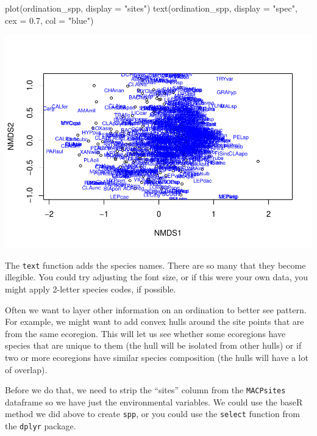 \documentclass[
]{book}
\newenvironment{Shaded}{\begin{snugshade}}{\end{snugshade}}
\newcommand{\AttributeTok}[1]{\textcolor[rgb]{0.77,0.63,0.00}{#1}}
\newcommand{\FloatTok}[1]{\textcolor[rgb]{0.00,0.00,0.81}{#1}}
\newcommand{\FunctionTok}[1]{\textcolor[rgb]{0.00,0.00,0.00}{#1}}
\newcommand{\NormalTok}[1]{#1}
\newcommand{\StringTok}[1]{\textcolor[rgb]{0.31,0.60,0.02}{#1}}
\begin{document}
\begin{Shaded}
\begin{Highlighting}[]
\FunctionTok{plot}\NormalTok{(ordination\_spp, }\AttributeTok{display =} \StringTok{"sites"}\NormalTok{)}
\FunctionTok{text}\NormalTok{(ordination\_spp, }\AttributeTok{display =} \StringTok{"spec"}\NormalTok{, }\AttributeTok{cex =} \FloatTok{0.7}\NormalTok{, }\AttributeTok{col =} \StringTok{"blue"}\NormalTok{)}
\end{Highlighting}
\end{Shaded}

\includegraphics{bookdown-demo_files/figure-latex/unnamed-chunk-18-1.pdf}

The \texttt{text} function adds the species names. There are so many that they become illegible. You could try adjusting the font size, or if this were your own data, you might apply 2-letter species codes, if possible.

Often we want to layer other information on an ordination to better see pattern. For example, we might want to add convex hulls around the site points that are from the same ecoregion. This will let us see whether some ecoregions have species that are unique to them (the hull will be isolated from other hulls) or if two or more ecoregions have similar species composition (the hulls will have a lot of overlap).

Before we do that, we need to strip the ``sites'' column from the \texttt{MACPsites} dataframe so we have just the environmental variables. We could use the baseR method we did above to create \texttt{spp}, or you could use the \texttt{select} function from the \texttt{dplyr} package.
\end{document}
